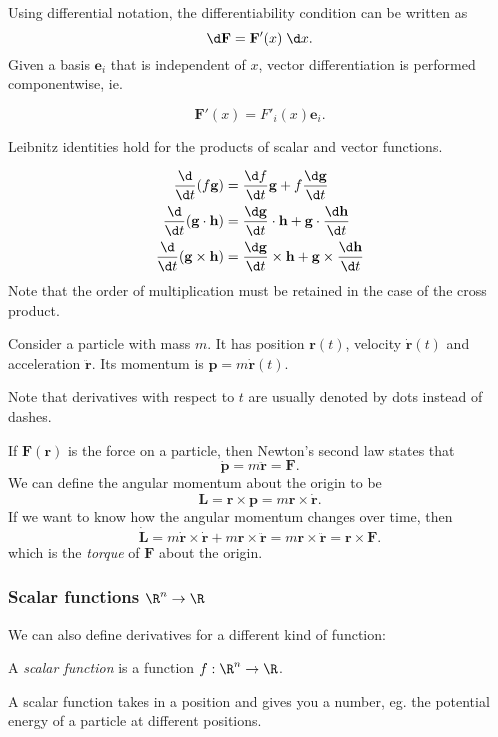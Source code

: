 \documentclass[a4paper]{article}
\begin{document}
Using differential notation, the differentiability condition can be written as
\[
  \d\mathbf{F} = \mathbf{F}'(x)\;\d x.
\]
Given a basis $\mathbf{e}_i$ that is independent of $x$, vector differentiation is performed componentwise, ie.
\begin{prop}
  \[
    \mathbf{F}'(x) = F'_i(x)\mathbf{e}_i.
  \]
\end{prop}
Leibnitz identities hold for the products of scalar and vector functions.
\begin{prop}
  \begin{align*}
    \frac{\d}{\d t}(f\mathbf{g}) &= \frac{\d f}{\d t}\mathbf{g} + f\frac{\d \mathbf{g}}{\d t}\\
    \frac{\d}{\d t}(\mathbf{g}\cdot \mathbf{h}) &= \frac{\d \mathbf{g}}{\d t}\cdot \mathbf{h} + \mathbf{g}\cdot \frac{\d \mathbf{h}}{\d t}\\
    \frac{\d}{\d t}(\mathbf{g}\times \mathbf{h}) &= \frac{\d \mathbf{g}}{\d t}\times \mathbf{h} + \mathbf{g}\times \frac{\d \mathbf{h}}{\d t}
  \end{align*}
  Note that the order of multiplication must be retained in the case of the cross product.
\end{prop}

\begin{eg}
  Consider a particle with mass $m$. It has position $\mathbf{r}(t)$, velocity $\dot{\mathbf{r}}(t)$ and acceleration $\ddot{\mathbf{r}}$. Its momentum is $\mathbf{p} = m\dot{\mathbf{r}}(t)$.

  Note that derivatives with respect to $t$ are usually denoted by dots instead of dashes.

  If $\mathbf{F}(\mathbf{r})$ is the force on a particle, then Newton's second law states that
  \[
    \dot{\mathbf{p}} = m\ddot{\mathbf{r}} = \mathbf{F}.
  \]
  We can define the angular momentum about the origin to be
  \[
    \mathbf{L} = \mathbf{r}\times \mathbf{p} = m\mathbf{r} \times \dot{\mathbf{r}}.
  \]
  If we want to know how the angular momentum changes over time, then
  \[
    \dot{\mathbf{L}} = m\dot{\mathbf{r}}\times \dot{\mathbf{r}} + m\mathbf{r}\times \ddot{\mathbf{r}} = m\mathbf{r}\times \ddot{\mathbf{r}} = \mathbf{r}\times \mathbf{F}.
  \]
  which is the \emph{torque} of $\mathbf{F}$ about the origin.
\end{eg}

\subsubsection*{Scalar functions \texorpdfstring{$\R^n \to \R$}{Rn to R}}
We can also define derivatives for a different kind of function:
\begin{defi}
  A \emph{scalar function} is a function $f: \R^n \to \R$.
\end{defi}
A scalar function takes in a position and gives you a number, eg. the potential energy of a particle at different positions.
\end{document}
